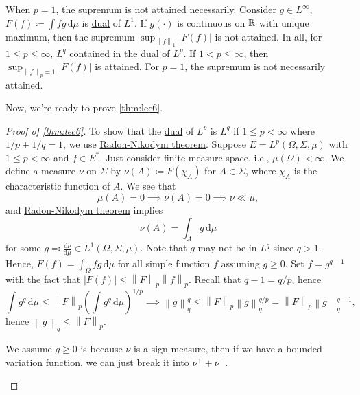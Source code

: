 
\begin{remark}
	When \(p = 1\), the supremum is not attained necessarily. Consider \(g\in L^{\infty} \), \(F(f) \coloneqq \int fg\,\mathrm{d} \mu \) is \hyperref[def:dual-space]{dual} of \(L^1\). If \(g(\cdot)\) is continuous on \(\mathbb{\MakeUppercase{r}} \) with unique maximum, then the supremum \(\sup _{\left\lVert f\right\rVert _1}\left\vert F(f) \right\vert\) is not attained. In all, for \(1 \leq p\leq \infty \), \(L^q\) contained in the \hyperref[def:dual-space]{dual} of \(L^p\). If \(1 < p \leq \infty \), then \(\sup _{\left\lVert f\right\rVert _p = 1} \left\vert F(f) \right\vert \) is attained. For \(p = 1\), the supremum is not necessarily attained.
\end{remark}

Now, we're ready to prove \autoref{thm:lec6}.

\begin{proof}[Proof of \autoref{thm:lec6}]
	To show that the \hyperref[def:dual-space]{dual} of \(L^p\) is \(L^q\) if \(1 \leq p < \infty \) where \(1 / p + 1 / q = 1\), we use \hyperref[thm:Radon-Nikodym]{Radon-Nikodym theorem}. Suppose \(E = L^p(\Omega , \Sigma , \mu )\) with \(1 \leq p < \infty \) and \(f\in E^{\ast} \). Just consider finite measure space, i.e., \(\mu (\Omega ) < \infty \). We define a measure \(\nu \) on \(\Sigma \) by \(\nu (A) \coloneqq F(\chi _A)\) for \(A\in \Sigma \), where \(\chi _A\) is the characteristic function of \(A\). We see that
	\[
		\mu (A) = 0 \implies \nu (A) = 0 \implies \nu \ll \mu,
	\]
	and \hyperref[thm:Radon-Nikodym]{Radon-Nikodym theorem} implies
	\[
		\nu (A) = \int _A g\,\mathrm{d} \mu
	\]
	for some \(g \eqqcolon \frac{\mathrm{d}\nu }{\mathrm{d}\mu } \in L^1(\Omega , \Sigma , \mu )\). Note that \(g\) may not be in \(L^q\) since \(q > 1\). Hence, \(F(f)= \int _\Omega fg \,\mathrm{d} \mu \) for all simple function \(f\) assuming \(g \geq 0\). Set \(f = g^{q - 1}\) with the fact that \(\left\vert F(f) \right\vert  \leq \left\lVert F\right\rVert _p \left\lVert f\right\rVert _p\). Recall that \(q - 1 = q / p\), hence
	\[
		\int g^q\,\mathrm{d} \mu \leq \left\lVert F\right\rVert _p \left( \int g^q \,\mathrm{d} \mu  \right) ^{1 / p} \implies \left\lVert g\right\rVert _q ^q \leq \left\lVert F\right\rVert _p \left\lVert g\right\rVert _q ^{q / p} = \left\lVert F\right\rVert _p \left\lVert g\right\rVert _q ^{q - 1},
	\]
	hence \(\left\lVert g\right\rVert _q \leq \left\lVert F\right\rVert _p\).

	\begin{note}
		We assume \(g \geq 0\) is because \(\nu \) is a sign measure, then if we have a bounded variation function, we can just break it into \(\nu ^+ + \nu ^-\).
	\end{note}
\end{proof}

